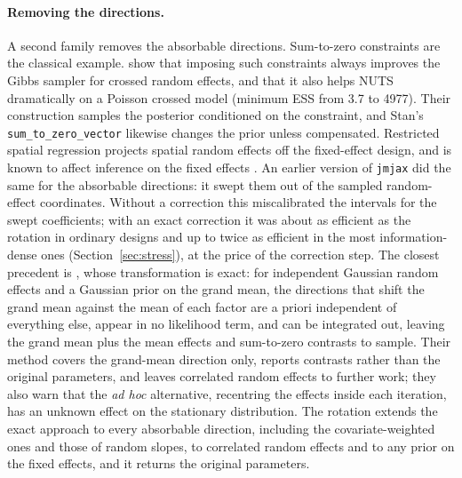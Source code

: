 \paragraph{Removing the directions.} A second family removes the
absorbable directions. Sum-to-zero constraints are the classical example.
\citet{zanella2021} show that imposing such constraints always improves
the Gibbs sampler for crossed random effects, and that it also helps NUTS
dramatically on a Poisson crossed model (minimum ESS from 3.7 to 4977).
Their construction samples the posterior conditioned on the constraint,
and Stan's \texttt{sum\_to\_zero\_vector} likewise changes the prior unless
compensated. Restricted spatial regression \citep{reich2006,hughes2013}
projects spatial random effects off the fixed-effect design, and is known
to affect inference on the fixed effects
\citep{hodges2010,hanks2015,khan2022}. An earlier version of
\texttt{jmjax} did the same for the absorbable directions: it swept them
out of the sampled random-effect coordinates. Without a correction this
miscalibrated the intervals for the swept coefficients; with an exact
correction it was about as efficient as the rotation in ordinary designs
and up to twice as efficient in the most information-dense ones
(Section~\ref{sec:stress}), at the price of the correction step. The
closest precedent is \citet{vines1996}, whose transformation is exact: for
independent Gaussian random effects and a Gaussian prior on the grand mean,
the directions that shift the grand mean against the mean of each factor
are a priori independent of everything else, appear in no likelihood term,
and can be integrated out, leaving the grand mean plus the mean effects and
sum-to-zero contrasts to sample. Their method covers the grand-mean
direction only, reports contrasts rather than the original parameters, and
leaves correlated random effects to further work; they also warn that the
\emph{ad hoc} alternative, recentring the effects inside each iteration,
has an unknown effect on the stationary distribution. The rotation
extends the exact approach to every absorbable direction, including the
covariate-weighted ones and those of random slopes, to correlated random
effects and to any prior on the fixed effects, and it returns the original
parameters.


